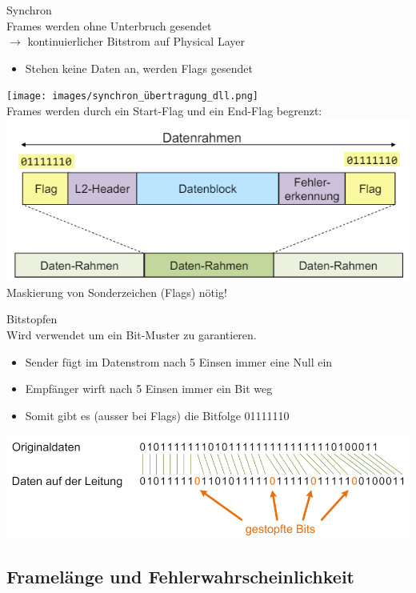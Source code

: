 \begin{concept}{Synchron}\\
    Frames werden ohne Unterbruch gesendet \\
    $\rightarrow$ kontinuierlicher Bitstrom auf Physical Layer
    \begin{itemize}
        \item Stehen keine Daten an, werden Flags gesendet
    \end{itemize}
    \texttt{[image: images/synchron\_übertragung\_dll.png]}\\
    Frames werden durch ein Start-Flag und ein End-Flag begrenzt:\\
    \includegraphics[width=0.7\linewidth]{images/flags_frames.png}\\
    Maskierung von Sonderzeichen (Flags) nötig!
\end{concept}

\begin{concept}{Bitstopfen}\\
    Wird verwendet um ein Bit-Muster zu garantieren.
    \begin{itemize}
        \item Sender fügt im Datenstrom nach 5 Einsen immer eine Null ein
        \item Empfänger wirft nach 5 Einsen immer ein Bit weg
        \item Somit gibt es (ausser bei Flags) die Bitfolge 01111110
    \end{itemize}
        \includegraphics[width=0.8\linewidth]{images/bit_stuffing.png}
\end{concept}

\subsection{Framelänge und Fehlerwahrscheinlichkeit}

